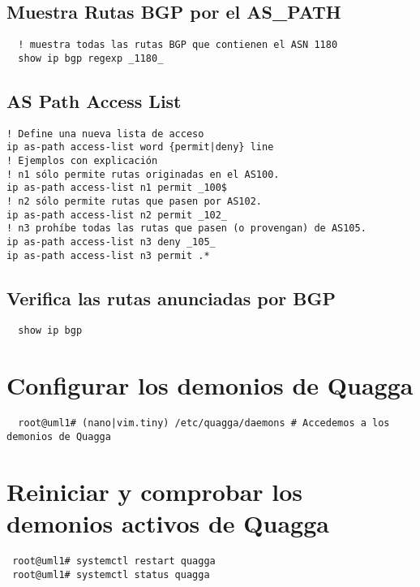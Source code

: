 \documentclass{article}
\begin{document}
\subsection{Muestra Rutas BGP por el AS\_PATH}
\begin{verbatim}
  ! muestra todas las rutas BGP que contienen el ASN 1180
  show ip bgp regexp _1180_
\end{verbatim}

\subsection{AS Path Access List}
\begin{verbatim}
! Define una nueva lista de acceso
ip as-path access-list word {permit|deny} line
! Ejemplos con explicación
! n1 sólo permite rutas originadas en el AS100.
ip as-path access-list n1 permit _100$
! n2 sólo permite rutas que pasen por AS102.
ip as-path access-list n2 permit _102_
! n3 prohíbe todas las rutas que pasen (o provengan) de AS105.
ip as-path access-list n3 deny _105_
ip as-path access-list n3 permit .*
\end{verbatim}

\subsection{Verifica las rutas anunciadas por BGP}
\begin{verbatim}
  show ip bgp
\end{verbatim}

\section{Configurar los demonios de Quagga}
\begin{verbatim}
  root@uml1# (nano|vim.tiny) /etc/quagga/daemons # Accedemos a los demonios de Quagga
\end{verbatim}

\section{Reiniciar y comprobar los demonios activos de Quagga}
\begin{verbatim}
 root@uml1# systemctl restart quagga
 root@uml1# systemctl status quagga
\end{verbatim}
\end{document}

